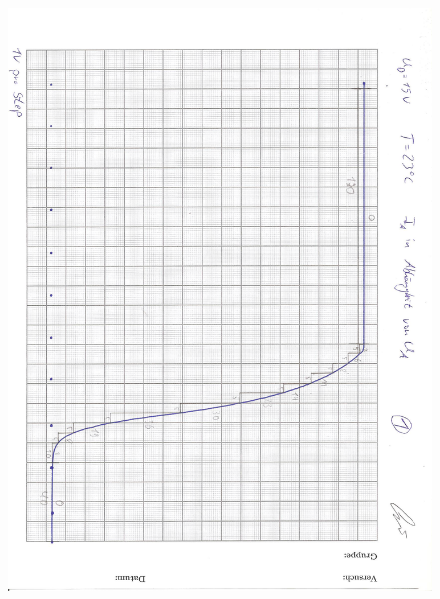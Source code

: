 \begin{figure}[H]
    \label{fig:Abb1}
    \centering
    \includegraphics[height=25cm]{"Energieverteilung.jpg"}
\end{figure}

